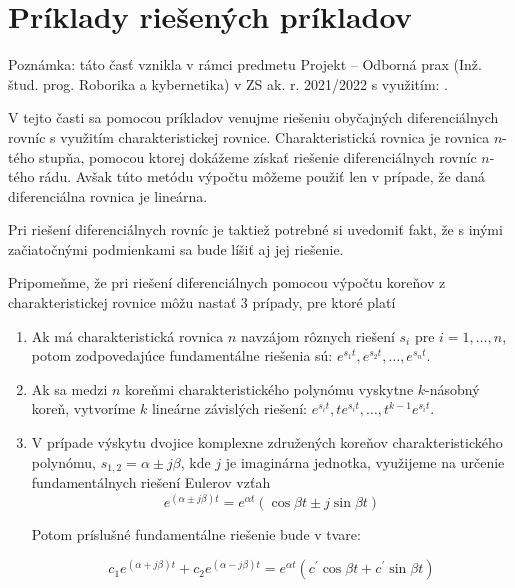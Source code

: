 \documentclass[a4paper, 10pt, ]{article}
\begin{document}
\section{Príklady riešených príkladov}



Poznámka: táto časť vznikla v rámci predmetu Projekt -- Odborná prax (Inž. štud. prog. Roborika a kybernetika) v ZS ak. r. 2021/2022 s využitím: .



\medskip

\noindent
V tejto časti sa pomocou príkladov venujme riešeniu obyčajných diferenciálnych rovníc s využitím charakteristickej rovnice. Charakteristická rovnica je rovnica $n$-tého stupňa, pomocou ktorej dokážeme získať riešenie diferenciálnych rovníc $n$-tého rádu. Avšak túto metódu výpočtu môžeme použiť len v prípade, že daná diferenciálna rovnica je lineárna.

Pri riešení diferenciálnych rovníc je taktiež potrebné si uvedomiť fakt, že s inými začiatočnými podmienkami sa bude líšiť aj jej riešenie.

Pripomeňme, že pri riešení diferenciálnych pomocou výpočtu koreňov z charakteristickej rovnice môžu nastať 3 prípady, pre ktoré platí

\begin{enumerate}
    \item Ak má charakteristická rovnica $n$ navzájom rôznych riešení $s_{i}$ pre $i = 1, \dots ,n$, potom zodpovedajúce fundamentálne riešenia sú: $e^{s_{1}t}, e^{s_{2}t}, \dots , e^{s_{n}t}$.
    \item Ak sa medzi $n$ koreňmi charakteristického polynómu vyskytne $k$-násobný koreň,
    vytvoríme $k$ lineárne závislých riešení: $e^{s_{i}t}, te^{s_{i}t}, \dots , t^{k-1}e^{s_{i}t}$.
    \item V prípade výskytu dvojice komplexne združených koreňov charakteristického polynómu, $s_{1,2} = \alpha \pm j\beta$, kde $j$ je imaginárna jednotka, využijeme na určenie fundamentálnych riešení Eulerov vzťah
    \begin{equation}
        e^{(\alpha \pm j\beta)t} = e^{\alpha t}(\cos{\beta t} \pm j \sin{\beta t})
    \end{equation}
    
    Potom príslušné fundamentálne riešenie bude v tvare:
    
    \begin{equation}
        c_{1}e^{(\alpha + j\beta)t} + c_{2}e^{(\alpha - j\beta)t} = e^{\alpha t}(c^{'}\cos{\beta t} + c^{'}\sin{\beta t})
    \end{equation}
\end{enumerate}
\end{document}
